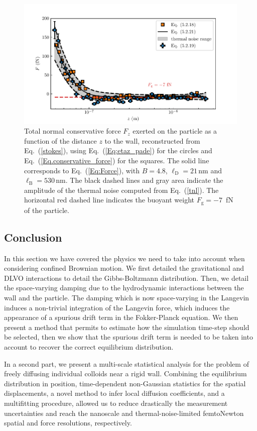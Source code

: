 \begin{figure}[H]
	\centering
	\includegraphics{02_body/chapter3/images/trajctory_analysis/figure_force_total.pdf}
	\caption{Total normal conservative force $F_z$ exerted on the particle as a function of the distance $z$ to the wall, reconstructed from Eq.~(\ref{stokes}), using Eq.~(\ref{Eq:etaz_pade}) for the circles and Eq.~(\ref{Eq.conservative_force}) for the squares. The solid line corresponds to Eq.~(\ref{Eq:Force}), with $B=4.8$, $\ell_{\mathrm{D}}=21\,\mathrm{nm}$ and $\ell_{\mathrm{B}}=530\,\mathrm{nm}$. The black dashed lines and gray area indicate the amplitude of the thermal noise computed from Eq.~(\ref{tnl}). The horizontal red dashed line indicates the buoyant weight $F_{\textrm{g}}=-7$~fN of the particle.}
	\label{fig.figure_force_total}
\end{figure}

\subsection{Conclusion}

In this section we have covered the physics we need to take into account when considering confined Brownian motion. We first detailed the gravitational and DLVO interactions to detail the Gibbs-Boltzmann distribution. Then, we detail the space-varying damping due to the hydrodynamic interactions between the wall and the particle. The damping which is now space-varying in the Langevin induces a non-trivial integration of the Langevin force, which induces the appearance of a spurious drift term in the Fokker-Planck equation. We then present a method that permits to estimate how the simulation time-step should be selected, then we show that the spurious drift term is needed to be taken into account to recover the correct equilibrium distribution.

In a second part, we present a multi-scale statistical analysis for the problem of freely diffusing individual colloids near a rigid wall. Combining the equilibrium distribution in position, time-dependent non-Gaussian statistics for the spatial displacements, a novel method to infer local diffusion coefficients, and a multifitting procedure, allowed us to reduce drastically the measurement uncertainties and reach the nanoscale and thermal-noise-limited femtoNewton spatial and force resolutions, respectively.



